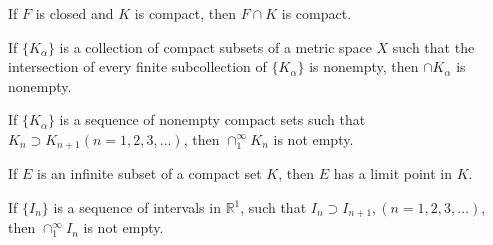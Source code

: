 

\begin{myCorollary}
    If $F$ is closed and $K$ is compact, then $F \cap K$ is compact.
\end{myCorollary}



\begin{thm}
    If $\{K_\alpha\}$ is a collection of compact subsets of a metric space $X$ such that the intersection of every finite subcollection of $\{K_\alpha\}$ is nonempty, then $\cap K_\alpha$ is nonempty.    
\end{thm}


\begin{myCorollary}
    If $\{K_\alpha\}$ is a sequence of nonempty compact sets such that $K_n \supset K_{n+1} (n=1,2,3,...)$, then $\cap_1^\infty K_n$ is not empty.
\end{myCorollary}

\begin{thm}
    If $E$ is an infinite subset of a compact set $K$, then $E$ has a limit point in $K$.
\end{thm}

\begin{thm}
    If $\{I_n\}$ is a sequence of intervals in $\mathbb{R}^1$, such that $I_n \supset I_{n+1}, (n=1,2,3,...)$, then $\cap_1^\infty I_n$ is not empty.
\end{thm}

